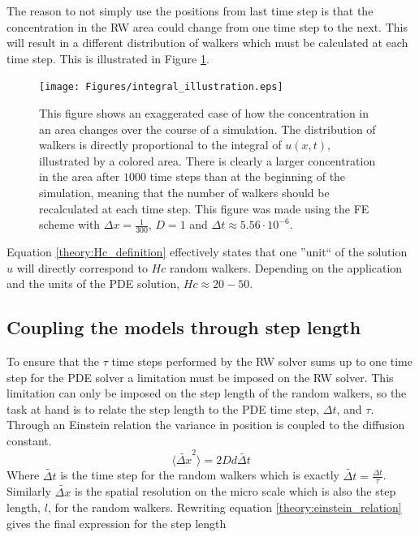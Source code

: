 The reason to not simply use the positions from last time step is that the concentration in the RW area could change from one time step to the next. 
This will result in a different distribution of walkers which must be calculated at each time step. This is illustrated in Figure \ref{theory:concentration_update}.
\begin{figure}[H]
 \centering
 \texttt{[image: Figures/integral\_illustration.eps]}
 \caption[Reason for RW update each time step]{This figure shows an exaggerated case of how the concentration in an area changes over the course of a simulation. The distribution of walkers is directly proportional to the integral of $u(x,t)$, illustrated by a colored area. There is clearly a larger concentration in the area after $1000$ time steps than at the beginning of the simulation, meaning that the number of walkers should be recalculated at each time step. This figure was made using the FE scheme with $\Delta x = \frac{1}{300}$, $D = 1$ and $\Delta t \approx 5.56\cdot 10^{-6}$.}
 \label{theory:concentration_update}
\end{figure}

Equation \eqref{theory:Hc_definition} effectively states that one ''unit`` of the solution $u$ will directly correspond to $Hc$ random walkers. Depending on the application and the units of the PDE solution, $Hc \approx 20-50$.

\subsection{Coupling the models through step length}

To ensure that the $\tau$ time steps performed by the RW solver sums up to one time step for the PDE solver a limitation must be imposed on the RW solver. 
This limitation can only be imposed on the step length of the random walkers, so the task at hand is to relate the step length to the PDE time step, $\Delta t$, and $\tau$. \\
Through an Einstein relation the variance in position is coupled to the diffusion constant.
\begin{equation}\label{theory:einstein_relation}
 \langle\tilde{\Delta x}^2\rangle = 2Dd\tilde{\Delta t}
\end{equation}
Where $\tilde{\Delta t}$ is the time step for the random walkers which is exactly $\tilde{\Delta t} = \frac{\Delta t}{\tau}$. 
Similarly $\tilde{\Delta x}$ is the spatial resolution on the micro scale which is also the step length, $l$, for the random walkers. 
Rewriting equation \eqref{theory:einstein_relation} gives the final expression for the step length

